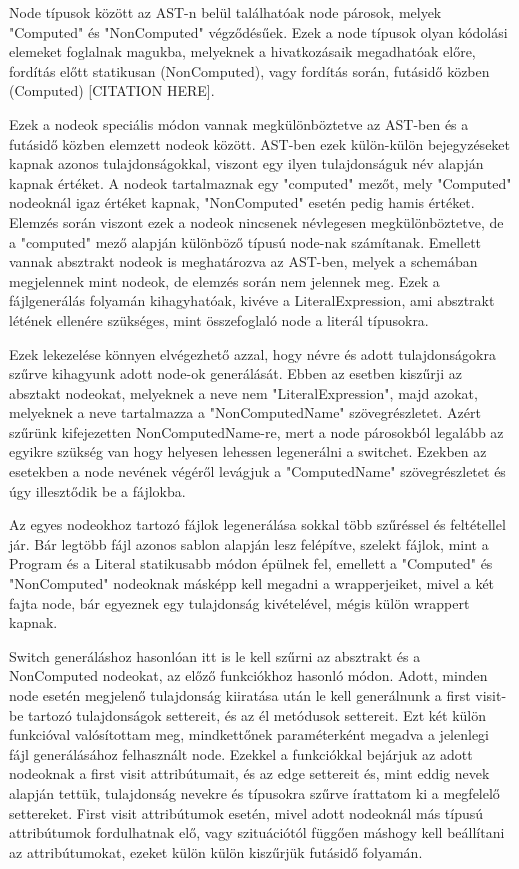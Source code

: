 Node típusok között az AST-n belül találhatóak node párosok, melyek "Computed" és "NonComputed" végződésűek. Ezek a node típusok olyan kódolási elemeket foglalnak magukba, melyeknek a hivatkozásaik megadhatóak előre, fordítás előtt statikusan (NonComputed), vagy fordítás során, futásidő közben (Computed) [CITATION HERE].

Ezek a nodeok speciális módon vannak megkülönböztetve az AST-ben és a futásidő közben elemzett nodeok között. AST-ben ezek külön-külön bejegyzéseket kapnak azonos tulajdonságokkal, viszont egy ilyen tulajdonságuk név alapján kapnak értéket. A nodeok tartalmaznak egy "computed" mezőt, mely "Computed" nodeoknál igaz értéket kapnak, "NonComputed" esetén pedig hamis értéket. Elemzés során viszont ezek a nodeok nincsenek névlegesen megkülönböztetve, de a "computed" mező alapján különböző típusú node-nak számítanak.
Emellett vannak absztrakt nodeok is meghatározva az AST-ben, melyek a schemában megjelennek mint nodeok, de elemzés során nem jelennek meg. Ezek a fájlgenerálás folyamán kihagyhatóak, kivéve a LiteralExpression, ami absztrakt létének ellenére szükséges, mint összefoglaló node a literál típusokra.

Ezek lekezelése könnyen elvégezhető azzal, hogy névre és adott tulajdonságokra szűrve kihagyunk adott node-ok generálását. 
Ebben az esetben kiszűrji az absztakt nodeokat, melyeknek a neve nem "LiteralExpression", majd azokat, melyeknek a neve tartalmazza a "NonComputedName" szövegrészletet. Azért szűrünk kifejezetten NonComputedName-re, mert a node párosokból legalább az egyikre szükség van hogy helyesen lehessen legenerálni a switchet. Ezekben az esetekben a node nevének végéről levágjuk a "ComputedName" szövegrészletet és úgy illesztődik be a fájlokba.

Az egyes nodeokhoz tartozó fájlok legenerálása sokkal több szűréssel és feltétellel jár. Bár legtöbb fájl azonos sablon alapján lesz felépítve, szelekt fájlok, mint a Program és a Literal statikusabb módon épülnek fel, emellett a "Computed" és "NonComputed" nodeoknak másképp kell megadni a wrapperjeiket, mivel a két fajta node, bár egyeznek egy tulajdonság kivételével, mégis külön wrappert kapnak.

Switch generáláshoz hasonlóan itt is le kell szűrni az absztrakt és a NonComputed nodeokat, az előző funkciókhoz hasonló módon.
Adott, minden node esetén megjelenő tulajdonság kiiratása után le kell generálnunk a first visit-be tartozó tulajdonságok settereit, és az él metódusok settereit. Ezt két külön funkcióval valósítottam meg, mindkettőnek paraméterként megadva a jelenlegi fájl generálásához felhasznált node. 
Ezekkel a funkciókkal bejárjuk az adott nodeoknak a first visit attribútumait, és az edge settereit és, mint eddig nevek alapján tettük, tulajdonság nevekre és típusokra szűrve írattatom ki a megfelelő settereket.
First visit attribútumok esetén, mivel adott nodeoknál más típusú attribútumok fordulhatnak elő, vagy szituációtól függően máshogy kell beállítani az attribútumokat, ezeket külön külön kiszűrjük futásidő folyamán.

